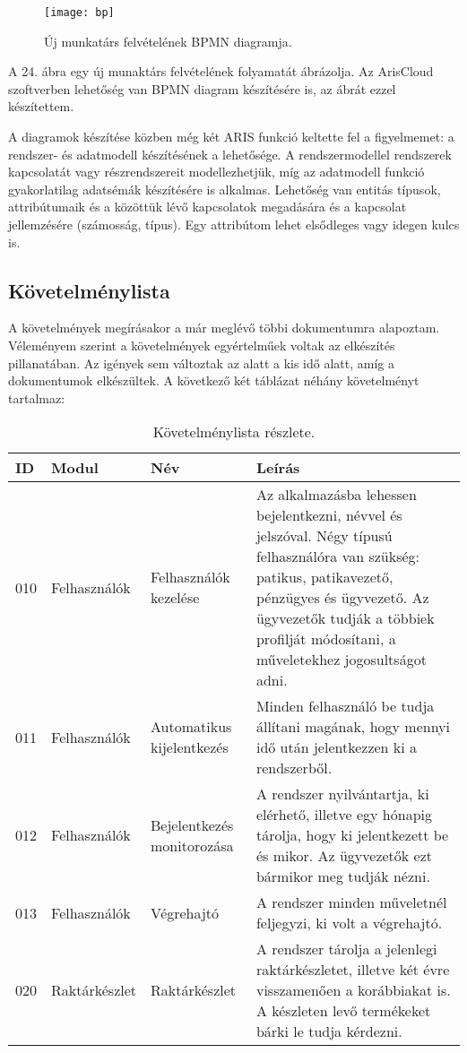 \documentclass[12pt]{article}
\begin{document}
\begin{figure}
\texttt{[image: bp]}
\caption{Új munkatárs felvételének BPMN diagramja.}
\end{figure}

A 24. ábra egy új munaktárs felvételének folyamatát ábrázolja. Az ArisCloud szoftverben lehetőség van BPMN diagram készítésére is, az ábrát ezzel készítettem.

A diagramok készítése közben még két ARIS funkció keltette fel a figyelmemet: a rendszer- és adatmodell készítésének a lehetősége. A rendszermodellel rendszerek kapcsolatát vagy részrendszereit modellezhetjük, míg az adatmodell funkció gyakorlatilag adatsémák készítésére is alkalmas. Lehetőség van entitás típusok, attribútumaik és a közöttük lévő kapcsolatok megadására és a kapcsolat jellemzésére (számosság, típus). Egy attribútom lehet elsődleges vagy idegen kulcs is.



\newpage
\subsection{ Követelménylista}

A követelmények megírásakor a már meglévő többi dokumentumra alapoztam. Véleményem szerint a követelmények egyértelműek voltak az elkészítés pillanatában. Az igények sem változtak az alatt a kis idő alatt, amíg a dokumentumok elkészültek. A következő két táblázat néhány követelményt tartalmaz:

\begin{table}[h!]
\centering
\begin{tabular}{ |p{0.5cm}|p{2.2cm}|p{2.2cm}|p{7cm}| } 
\hline
 \textbf{ID} & \textbf{Modul} &\textbf{Név} &\textbf{ Leírás} \\
\hline
010 & Felhasználók& Felhasználók kezelése& Az alkalmazásba lehessen bejelentkezni, névvel és jelszóval. Négy típusú felhasználóra van szükség: patikus, patikavezető, pénzügyes és ügyvezető. Az ügyvezetők tudják a többiek profilját módosítani, a műveletekhez jogosultságot adni.\\
\hline
011 & Felhasználók& Automatikus kijelentkezés& Minden felhasználó be tudja állítani magának, hogy mennyi idő után jelentkezzen ki a rendszerből.\\
\hline
012 & Felhasználók& Bejelentkezés monitorozása& A rendszer nyilvántartja, ki elérhető, illetve egy hónapig tárolja, hogy ki jelentkezett be és mikor. Az ügyvezetők ezt bármikor meg tudják nézni. \\
\hline
013 & Felhasználók& Végrehajtó & A rendszer minden műveletnél feljegyzi, ki volt a végrehajtó.\\

\hline
020 & Raktárkészlet& Raktárkészlet & A rendszer tárolja a jelenlegi raktárkészletet, illetve két évre visszamenően a korábbiakat is. A készleten levő termékeket bárki le tudja kérdezni. \\

\hline
\end{tabular}
\caption{Követelménylista részlete.}
\end{table}
\end{document}
